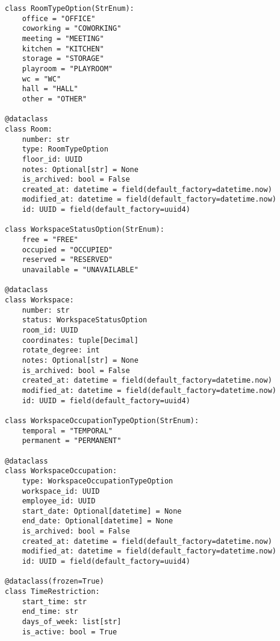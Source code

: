 \begin{lstlisting}[style=pythonstyle]
class RoomTypeOption(StrEnum):
    office = "OFFICE"
    coworking = "COWORKING"
    meeting = "MEETING"
    kitchen = "KITCHEN"
    storage = "STORAGE"
    playroom = "PLAYROOM"
    wc = "WC"
    hall = "HALL"
    other = "OTHER"

@dataclass
class Room:
    number: str
    type: RoomTypeOption
    floor_id: UUID
    notes: Optional[str] = None
    is_archived: bool = False
    created_at: datetime = field(default_factory=datetime.now)
    modified_at: datetime = field(default_factory=datetime.now)
    id: UUID = field(default_factory=uuid4)

class WorkspaceStatusOption(StrEnum):
    free = "FREE"
    occupied = "OCCUPIED"
    reserved = "RESERVED"
    unavailable = "UNAVAILABLE"

@dataclass
class Workspace:
    number: str
    status: WorkspaceStatusOption
    room_id: UUID
    coordinates: tuple[Decimal]
    rotate_degree: int
    notes: Optional[str] = None
    is_archived: bool = False
    created_at: datetime = field(default_factory=datetime.now)
    modified_at: datetime = field(default_factory=datetime.now)
    id: UUID = field(default_factory=uuid4)

class WorkspaceOccupationTypeOption(StrEnum):
    temporal = "TEMPORAL"
    permanent = "PERMANENT"

@dataclass
class WorkspaceOccupation:
    type: WorkspaceOccupationTypeOption
    workspace_id: UUID
    employee_id: UUID
    start_date: Optional[datetime] = None
    end_date: Optional[datetime] = None
    is_archived: bool = False
    created_at: datetime = field(default_factory=datetime.now)
    modified_at: datetime = field(default_factory=datetime.now)
    id: UUID = field(default_factory=uuid4)

@dataclass(frozen=True)
class TimeRestriction:
    start_time: str
    end_time: str
    days_of_week: list[str]
    is_active: bool = True
\end{lstlisting}
